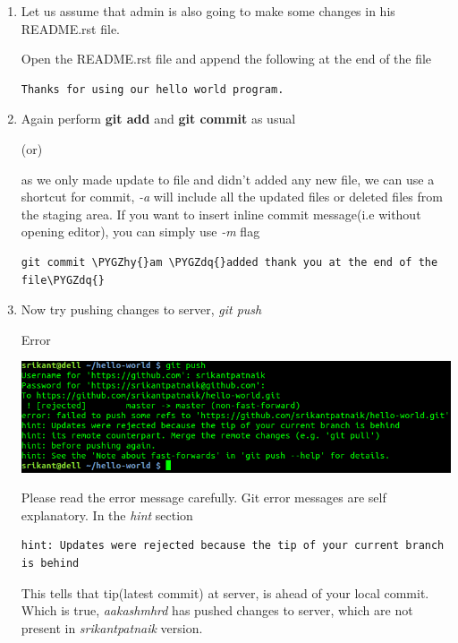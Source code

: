 \documentclass[letterpaper,10pt,english]{sphinxmanual}
\def\PYGZhy{\char`\-}
\def\PYGZdq{\char`\"}
\begin{document}
\begin{enumerate}
\item {} 
Let us assume that admin is also going to make some changes in his README.rst
file.

Open the README.rst file and append the following at the end of the file

\begin{Verbatim}[commandchars=\\\{\}]
Thanks for using our hello world program.
\end{Verbatim}

\item {} 
Again perform \textbf{git add} and  \textbf{git commit} as usual

(or)

as we only made update to file and didn't added any new file, we can use
a shortcut for commit, \emph{-a} will include all the updated files or deleted
files from the staging area. If you want to insert inline commit
message(i.e without opening editor), you can simply use \emph{-m} flag

\begin{Verbatim}[commandchars=\\\{\}]
git commit \PYGZhy{}am \PYGZdq{}added thank you at the end of the file\PYGZdq{}
\end{Verbatim}

\item {} 
Now try pushing changes to server, \emph{git push}

Error

\includegraphics[width=1.000\linewidth]{git-push-failed.png}

Please read the error message carefully. Git error messages are self
explanatory. In the \emph{hint} section

\begin{Verbatim}[commandchars=\\\{\}]
hint: Updates were rejected because the tip of your current branch is behind
\end{Verbatim}

This tells that tip(latest commit) at server, is ahead of your local commit.
Which is true, \emph{aakashmhrd} has pushed changes to server, which are not
present in \emph{srikantpatnaik} version.


\end{enumerate}
\end{document}
